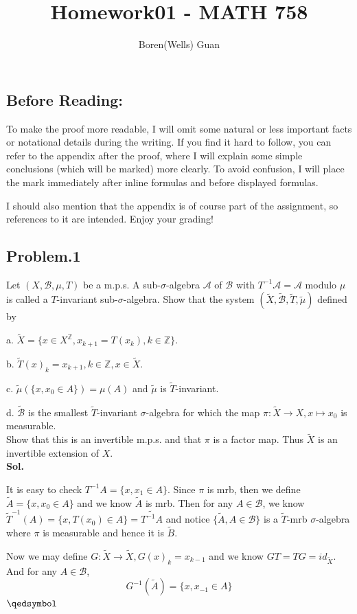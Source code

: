 \documentclass[lang=en,11pt,a4paper,citestyle =authoryear]{elegantpaper}
\title{Homework01 - MATH 758}
\author{Boren(Wells) Guan}
\newcommand{\prvd}{$\hfill \qedsymbol$}
\newcommand{\Z}{\mathbb{Z}}
\begin{document}
\maketitle

\subsection*{Before Reading:}\par
To make the proof more readable, I will omit some natural or less important facts or notational details during the writing. If you find it hard to follow, you can refer to the appendix after the proof, where I will explain some simple conclusions (which will be marked) more clearly. To avoid confusion, I will place the mark immediately after inline formulas and before displayed formulas.\par
I should also mention that the appendix is of course part of the assignment, so references to it are intended. Enjoy your grading!

\subsection*{Problem.1} 
Let $(X,\mathcal{B},\mu,T)$ be a m.p.s. A sub-$\sigma$-algebra $\mathcal{A}$ of $\mathcal{B}$ with $T^{-1}\mathcal{A} = \mathcal{A}$ modulo $\mu$ is called a $T$-invariant sub-$\sigma$-algebra. Show that the system $(\tilde{X},\tilde{\mathcal{B}},\tilde{T},\tilde{\mu})$ defined by\par
a. $\tilde{X} = \{x\in X^{\Z}, x_{k+1} = T(x_k), k\in\Z\}$.\par
b. $\tilde{T}(x)_k = x_{k+1}, k\in\Z,x\in\tilde{X}$.\par
c. $\tilde{\mu}(\{x,x_0 \in A\}) = \mu(A)$ and $\tilde{\mu}$ is $\tilde{T}$-invariant.\par
d. $\tilde{\mathcal{B}}$ is the smallest $\tilde{T}$-invariant $\sigma$-algebra for which the map $\pi:\tilde{X}\to X, x\mapsto x_0$ is measurable.\\
Show that this is an invertible m.p.s. and that $\pi$ is a factor map. Thus $\tilde{X}$ is an invertible extension of $X$.
\vspace{0.5em}\\
\textbf{Sol.} \par
It is easy to check $T^{-1}A = \{x, x_1 \in A\}$. Since $\pi$ is mrb, then we define $\tilde{A} = \{x,x_0\in A\}$ and we know $\tilde{A}$ is mrb. Then for any $A \in \mathcal{B}$, we know $\tilde{T}^{-1}(A) = \{x,T(x_0)\in A\} = \tilde{T^{-1}A}$ and notice $\{\tilde{A}, A\in\mathcal{B}\}$ is a $\tilde{T}$-mrb $\sigma$-algebra where $\pi$ is measurable and hence it is $\tilde{B}$.\par
Now we may define $G:\tilde{X} \to \tilde{X}, G(x)_k = x_{k-1}$ and we know $GT = TG = id_{\tilde{X}}$. And for any $A\in \mathcal{B}$,
\[G^{-1}(\tilde{A}) = \{x, x_{-1} \in A\}\]
\prvd
\vspace{0.5em}
\end{document}
